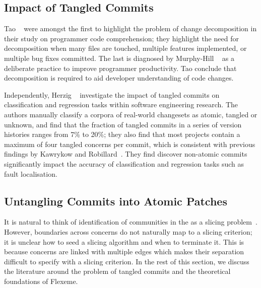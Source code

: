 \subsection{Impact of Tangled Commits}
\label{chapter:literature:sec:flexeme_rel_work:impact}

Tao \etal~\cite{Tao2012} were amongst the first to highlight the problem of
change decomposition in their study on programmer code comprehension; they
highlight the need for decomposition when many files are touched, multiple
features implemented, or multiple bug fixes committed. The last is diagnosed by
Murphy-Hill \etal~\cite{Murphy-Hill2012} as a deliberate practice to improve
programmer productivity. Tao \etal conclude that decomposition is required to
aid developer understanding of code changes.

Independently, Herzig \etal~\cite{Herzig2013, Herzig2016} investigate the impact
of tangled commits on classification and regression tasks within software
engineering research. The authors manually classify a corpora of real-world
changesets as atomic, tangled or unknown, and find that the fraction of tangled
commits in a series of version histories ranges from 7\% to 20\%; they also find
that most projects contain a maximum of four tangled concerns per commit, which
is  consistent with previous findings by Kawrykow and
Robillard~\cite{Kawrykow2011}. They find discover non-atomic commits
significantly impact the accuracy of classification and regression tasks such as
fault localisation. 

\subsection{Untangling Commits into Atomic Patches}
\label{chapter:literature:sec:flexeme_rel_work:untangle}

It is natural to think of identification of communities in the \deltaPDGN as a
slicing problem~\cite{slicingsurvey}. However, boundaries across concerns do not
naturally map to a slicing criterion; it is unclear how to seed a slicing
algorithm and when to terminate it. This is because concerns are linked with
multiple edges which makes their separation difficult to specify with a slicing
criterion. In the rest of this section, we discuss the literature around the
problem of tangled commits and the theoretical foundations of Flexeme.

